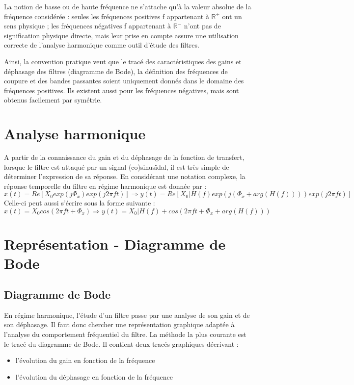 	La notion de basse ou de haute fréquence ne s’attache qu’à la valeur absolue de la fréquence considérée : seules les fréquences positives f appartenant à $\mathbb{R}^{+}$ ont un sens physique ; les fréquences négatives f appartenant à $\mathbb{R}^{-}$ n’ont pas de signification physique directe, mais leur prise en compte assure une utilisation correcte de l’analyse harmonique comme outil d’étude des filtres.
	
	Ainsi, la convention pratique veut que le tracé des caractéristiques des gains et déphasage des filtres (diagramme de Bode), la définition des fréquences de coupure et des bandes passantes soient uniquement donnés dans le domaine des fréquences positives. Ils existent aussi pour les fréquences négatives, mais sont obtenus facilement par symétrie.
	
	\vspace{1\baselineskip}
	
	\section{Analyse harmonique}
	A partir de la connaissance du gain et du déphasage de la fonction de transfert, lorsque le filtre est attaqué par un signal (co)sinusïdal, il est très simple de déterminer l'expression de sa réponse. En considérant une notation complexe, la réponse temporelle du filtre en régime harmonique est donnée par :
	\begin{equation}\label{}
	x(t) = Re[X_{0}exp(j\Phi_{x})exp(j2\pi ft)] \Rightarrow y(t) = Re[X_{0}|H(f)exp(j(\Phi_{x}+arg(H(f))))exp(j2\pi ft)]
	\end{equation}
	Celle-ci peut aussi s'écrire sous la forme suivante :
	\begin{equation}\label{key}
	x(t) = X_{0}cos(2\pi ft+\Phi_{x}) \Rightarrow y(t) = X_{0}|H(f)+cos(2\pi ft+\Phi_{x}+arg(H(f)))
	\end{equation}
	
	\section{Représentation - Diagramme de Bode}
	\subsection{Diagramme de Bode}
	En régime harmonique, l'étude d'un filtre passe par une analyse de son gain et de son déphasage. Il faut donc chercher une représentation graphique adaptée à l'analyse du comportement fréquentiel du filtre. La méthode la plus courante est le tracé du diagramme de Bode. Il contient deux tracés graphiques décrivant :
	\begin{itemize}
		\item l'évolution du gain en fonction de la fréquence
		\item l'évolution du déphasage en fonction de la fréquence
	\end{itemize}

